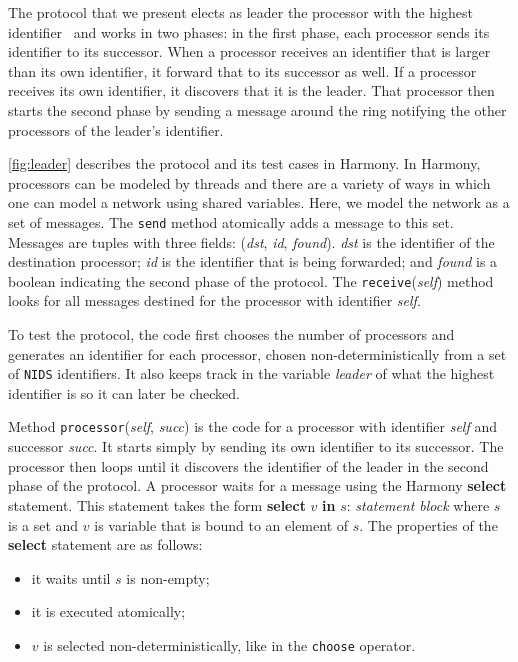 \documentclass{report}
\begin{document}
The protocol that we present elects as leader the processor with the
highest identifier~\cite{CR79} and works in two phases: in the first
phase, each processor sends its identifier to its successor.  When
a processor receives an identifier that is larger than its own
identifier, it forward that to its successor as well.  If a processor
receives its own identifier, it discovers that it is the leader.  That
processor then starts the second phase by sending a message around the
ring notifying the other processors of the leader's identifier.

\autoref{fig:leader} describes the protocol and its test cases in Harmony.
In Harmony, processors can be modeled by threads and there are a variety of ways in
which one can model a network using shared variables.
Here, we model the network as a set of messages.
The \texttt{send} method atomically adds a message to this set.
Messages are tuples with three fields:
(\textit{dst}, \textit{id}, \textit{found}).
\textit{dst} is the identifier of the destination processor;
\textit{id} is the identifier that is being forwarded; and
\textit{found} is a boolean indicating the second phase of the protocol.
The \texttt{receive}(\textit{self}) method looks for all messages
destined for the processor with identifier \textit{self}.

To test the protocol, the code first chooses the number of processors
and generates an identifier for each
processor, chosen non-deterministically from a set of \texttt{NIDS}
identifiers.  It also keeps track in the variable \textit{leader} of
what the highest identifier is so it can later be checked.

Method \texttt{processor}(\textit{self}, \textit{succ}) is the
code for a processor with identifier \textit{self} and successor
\textit{succ}.
It starts simply by sending its own identifier to its successor.
The processor then loops until it discovers the identifier of the
leader in the second phase of the protocol.
A processor waits for a message using the Harmony \textbf{select} statement.
This statement takes the form \textbf{select} $v$ \textbf{in} $s$: \emph{statement block}
where $s$ is a set and $v$ is variable that is bound to an element of $s$.
The properties of the \textbf{select} statement are as follows:
\begin{itemize}
\item it waits until $s$ is non-empty;
\item it is executed atomically;
\item $v$ is selected non-deterministically, like in the \texttt{choose} operator.
\end{itemize}
%
\end{document}
